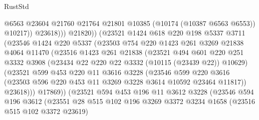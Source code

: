 \begin{lexlean}{RustStd}
\begin{coremodule}
                                @6563
                                @23604
                                @21760
                                @21764
                                @21801
                                @10385
                                (@10174 (@10387 @6563 @6553))
                                @10217))
                            @23618)))
                      @21820))
                  (@23521
                    @1424
                    @618
                    @220
                    @198
                    @5337
                    @3711
                    (@23546
                      @1424
                      @220
                      @5337
                      (@23503
                        @754
                        @220
                        @1423
                        @261
                        @3269
                        @21838
                        @4064
                        @11470
                        (@23516
                          @1423
                          @261
                          @21838
                          (@23521
                            @494
                            @601
                            @220
                            @251
                            @3332
                            @3908
                            (@23434 @22 @220 @22 @3332 (@10115 (@23439 @22)) @10629)
                            (@23521
                              @599
                              @453
                              @220
                              @11
                              @3616
                              @3228
                              (@23546
                                @599
                                @220
                                @3616
                                (@23503 @596 @220 @453 @11 @3269 @3228 @3614 @10592 @23464 @11817))
                              @23618)))
                        @17869))
                    (@23521
                      @594
                      @453
                      @196
                      @11
                      @3612
                      @3228
                      (@23546
                        @594
                        @196
                        @3612
                        (@23551
                          @28
                          @515
                          @102
                          @196
                          @3269
                          @3372
                          @3234
                          @1658
                          (@23516 @515 @102 @3372 @23619)

\end{coremodule}
\end{lexlean}
